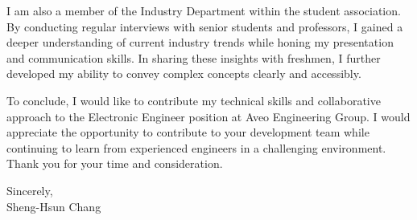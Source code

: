 \documentclass[12pt,a4paper]{article}
\newcommand{\Name}{Sheng-Hsun Chang}
\begin{document}
I am also a member of the Industry Department within the student association.
By conducting regular interviews with senior students and professors, I gained a deeper understanding of current 
industry trends while honing my presentation and communication skills. In sharing these insights with freshmen, 
I further developed my ability to convey complex concepts clearly and accessibly.

To conclude, I would like to contribute my technical skills and collaborative approach to the Electronic Engineer 
position at Aveo Engineering Group. I would appreciate the opportunity to contribute to your development team while continuing to learn from experienced engineers in a challenging environment. Thank you for your time and consideration.


Sincerely,\\
\vspace{10pt}
\Name
\end{document}
